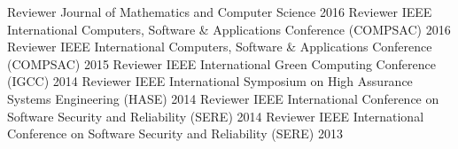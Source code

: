 \begin{cvhonors}
  \cvhonor
    {Reviewer}
    {Journal of Mathematics and Computer Science}
    {}
    {2016}
  \cvhonor
    {Reviewer}
    {IEEE International Computers, Software \& Applications Conference (COMPSAC)}
    {}
    {2016}
  \cvhonor
    {Reviewer}
    {IEEE International Computers, Software \& Applications Conference (COMPSAC)}
    {}
    {2015}
  \cvhonor
    {Reviewer}
    {IEEE International Green Computing Conference (IGCC)}
    {}
    {2014}
  \cvhonor
    {Reviewer}
    {IEEE International Symposium on High Assurance Systems Engineering (HASE)}
    {}
    {2014}
  \cvhonor
    {Reviewer}
    {IEEE International Conference on Software Security and Reliability (SERE)}
    {}
    {2014}
  \cvhonor
    {Reviewer}
    {IEEE International Conference on Software Security and Reliability (SERE)}
    {}
    {2013}
\end{cvhonors}